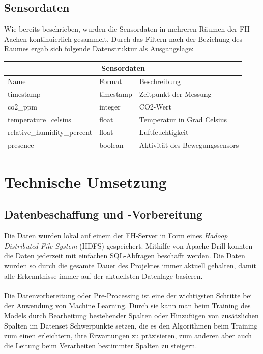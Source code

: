 \section{Sensordaten}
Wie bereits beschrieben, wurden die Sensordaten in mehreren Räumen der FH Aachen kontinuierlich 
gesammelt. Durch das Filtern nach der Beziehung des Raumes ergab sich folgende Datenstruktur als
Ausgangslage:\\

\begin{tabular}{|p{4.5cm}||p{3cm}|p{7cm}|}
    \hline
    \multicolumn{3}{|c|}{Sensordaten} \\
    \hline
    Name&Format &Beschreibung\\
    \hline
    timestamp&timestamp&Zeitpunkt der Messung\\
    co2\_ppm&integer&CO2-Wert\\
    temperature\_celsius&float&Temperatur in Grad Celsius\\
    relative\_humidity\_percent&float&Luftfeuchtigkeit\\
    presence&boolean&Aktivität des Bewegungssensors\\
    \hline
\end{tabular}     

\chapter{Technische Umsetzung}

\section{Datenbeschaffung und -Vorbereitung}
Die Daten wurden lokal auf einem der FH-Server in Form eines \textit{Hadoop Distributed File System} (HDFS) 
gespeichert. Mithilfe von Apache Drill konnten die Daten jederzeit mit einfachen SQL-Abfragen beschafft werden. 
Die Daten wurden so durch die gesamte Dauer des Projektes immer aktuell gehalten, damit alle Erkenntnisse 
immer auf der aktuellsten Datenlage basieren.
\\\\
Die Datenvorbereitung oder Pre-Processing ist eine der wichtigsten Schritte bei der Anwendung von Machine 
Learning. Durch sie kann man beim Training des Models durch Bearbeitung bestehender Spalten oder Hinzufügen 
von zusätzlichen Spalten im Datenset Schwerpunkte setzen, die es den Algorithmen beim Training zum einen 
erleichtern, ihre Erwartungen zu präzisieren, zum anderen aber auch die Leitung beim Verarbeiten bestimmter 
Spalten zu steigern.
